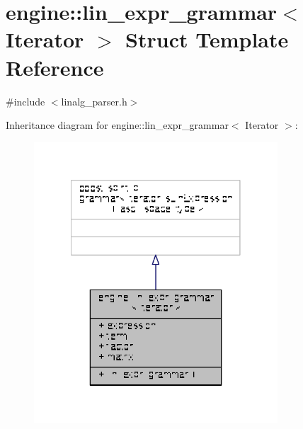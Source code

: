 \hypertarget{structengine_1_1lin__expr__grammar}{\section{engine\-:\-:lin\-\_\-expr\-\_\-grammar$<$ Iterator $>$ Struct Template Reference}
\label{structengine_1_1lin__expr__grammar}
}


{\ttfamily \#include $<$linalg\-\_\-parser.\-h$>$}



Inheritance diagram for engine\-:\-:lin\-\_\-expr\-\_\-grammar$<$ Iterator $>$\-:
\nopagebreak
\begin{figure}[H]
\begin{center}
\leavevmode
\includegraphics[width=258pt]{structengine_1_1lin__expr__grammar__inherit__graph}
\end{center}
\end{figure}



